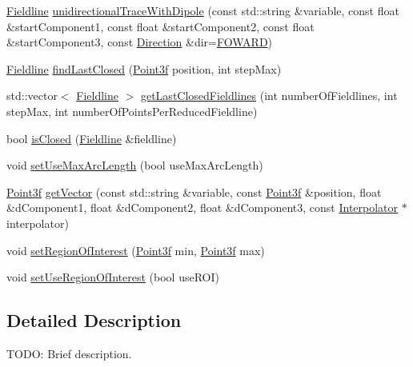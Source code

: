 \begin{DoxyCompactItemize}
\item 
\hyperlink{classccmc_1_1_fieldline}{Fieldline} \hyperlink{classccmc_1_1_tracer_a5f271069b9f92eafb9db48893ef19128}{unidirectional\-Trace\-With\-Dipole} (const std\-::string \&variable, const float \&start\-Component1, const float \&start\-Component2, const float \&start\-Component3, const \hyperlink{classccmc_1_1_tracer_a2c914b28e2e205cb1a7c01f2941fcae2}{Direction} \&dir=\hyperlink{classccmc_1_1_tracer_a2c914b28e2e205cb1a7c01f2941fcae2a133381f1178a2affb0f1c79a67b45e52}{F\-O\-W\-A\-R\-D})
\item 
\hyperlink{classccmc_1_1_fieldline}{Fieldline} \hyperlink{classccmc_1_1_tracer_a214b139e1f6a0a81f95745eb1b4ab0f2}{find\-Last\-Closed} (\hyperlink{classccmc_1_1_point3f}{Point3f} position, int step\-Max)
\item 
std\-::vector$<$ \hyperlink{classccmc_1_1_fieldline}{Fieldline} $>$ \hyperlink{classccmc_1_1_tracer_af8ed24a1334dbaa0cfbb024ef11ad8cb}{get\-Last\-Closed\-Fieldlines} (int number\-Of\-Fieldlines, int step\-Max, int number\-Of\-Points\-Per\-Reduced\-Fieldline)
\item 
bool \hyperlink{classccmc_1_1_tracer_aee62bc5b0bb724545d1fd32ae2af343f}{is\-Closed} (\hyperlink{classccmc_1_1_fieldline}{Fieldline} \&fieldline)
\item 
void \hyperlink{classccmc_1_1_tracer_aec22644edb73716c0be90a8aad3f9bdb}{set\-Use\-Max\-Arc\-Length} (bool use\-Max\-Arc\-Length)
\item 
\hyperlink{classccmc_1_1_point3f}{Point3f} \hyperlink{classccmc_1_1_tracer_a533ed52b1386402f83225c2fd81b8c40}{get\-Vector} (const std\-::string \&variable, const \hyperlink{classccmc_1_1_point3f}{Point3f} \&position, float \&d\-Component1, float \&d\-Component2, float \&d\-Component3, const \hyperlink{classccmc_1_1_interpolator}{Interpolator} $\ast$interpolator)
\item 
void \hyperlink{classccmc_1_1_tracer_a1978e6bc32b29821fcd8d673182da7c9}{set\-Region\-Of\-Interest} (\hyperlink{classccmc_1_1_point3f}{Point3f} min, \hyperlink{classccmc_1_1_point3f}{Point3f} max)
\item 
void \hyperlink{classccmc_1_1_tracer_adeeddca01155c69abfdd85711e049568}{set\-Use\-Region\-Of\-Interest} (bool use\-R\-O\-I)
\end{DoxyCompactItemize}


\subsection{Detailed Description}
T\-O\-D\-O\-: Brief description. 

